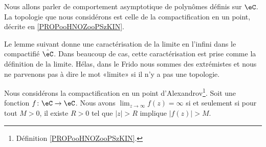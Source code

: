 Nous allons parler de comportement asymptotique de polynômes définis sur \( \eC\). La topologie que nous considérons est celle de la compactification en un point, décrite en \ref{PROPooHNOZooPSzKIN}.

Le lemme suivant donne une caractérisation de la limite en l'infini dans le compactifié \( \hat \eC\). Dans beaucoup de cas, cette caractérisation est prise comme la définition de la limite. Hélas, dans le Frido nous sommes des extrémistes et nous ne parvenons pas à dire le mot «limite» si il n'y a pas une topologie.
\begin{lemma}        \label{LEMooERABooQjLBzW}
	Nous considérons la compactification en un point d'Alexandrov\footnote{Définition \ref{PROPooHNOZooPSzKIN}.}. Soit une fonction \( f\colon \eC\to \eC\). Nous avons \( \lim_{z\to \infty} f(z)=\infty\) si et seulement si pour tout \( M>0\), il existe \( R>0\) tel que \( | z |>R\) implique \( | f(z) |>M\).
\end{lemma}


